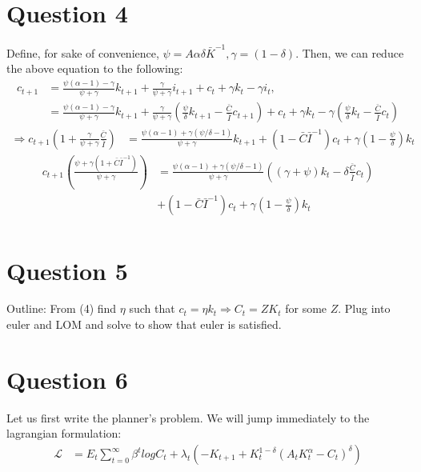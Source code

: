 \documentclass[11pt]{article} %
\begin{document}
\section{Question 4}
Define, for sake of convenience, $\psi = A\alpha\delta \bar{K}^{-1}, \gamma = (1-\delta)$. Then, we can reduce the above equation to the following:
\begin{align*}
c_{t+1} &= \frac{\psi (\alpha - 1) - \gamma}{\psi + \gamma}k_{t+1} + \frac{\gamma}{\psi + \gamma}i_{t+1} + c_t + \gamma k_t - \gamma i_t,\\
&= \frac{\psi (\alpha - 1) - \gamma}{\psi + \gamma}k_{t+1} + \frac{\gamma}{\psi + \gamma}\left(\frac{\psi}{\delta}k_{t+1} - \frac{\bar{C}}{\bar{I}}c_{t+1} \right)  + c_t + \gamma k_t - \gamma \left( \frac{\psi}{\delta}k_t - \frac{\bar{C}}{\bar{I}}c_t \right)
\end{align*}
\begin{align*}
\Rightarrow c_{t+1}\left( 1 + \frac{\gamma}{\psi + \gamma} \frac{\bar{C}}{\bar{I}}\right) &=  \frac{\psi (\alpha - 1) + \gamma(\psi/\delta - 1)}{\psi + \gamma}k_{t+1}   +(1 - \bar{C}\bar{I}^{-1}) c_t +  \gamma\left( 1-\frac{\psi}{\delta} \right)k_t 
\end{align*}
\begin{align*}
c_{t+1} \left( \frac{\psi+\gamma(1+\bar{C}\bar{I}^{-1})}{\psi + \gamma} \right) &= \frac{\psi (\alpha - 1) + \gamma(\psi/\delta - 1)}{\psi + \gamma}\left( \left(\gamma + \psi \right)k_t - \delta\frac{\bar{C}}{\bar{I}}c_t \right)\\ &+(1 - \bar{C}\bar{I}^{-1}) c_t +  \gamma\left( 1-\frac{\psi}{\delta}  \right)k_t \\
\end{align*}

\section{Question 5}
Outline: From (4) find $\eta$ such that $c_t = \eta k_t \Rightarrow C_t = ZK_t$ for some $Z$. Plug into euler and LOM and solve to show that euler is satisfied.
\section{Question 6}
Let us first write the planner's problem. We will jump immediately to the lagrangian formulation:
\begin{align*}
\mathcal{L} &= E_t\sum_{t=0}^{\infty} \beta^t log C_t + \lambda_t\left(-K_{t+1}+ K_t^{1-\delta}\left( A_tK_t^{\alpha}  - C_t \right)^{\delta}\right)
\end{align*}
\end{document}
